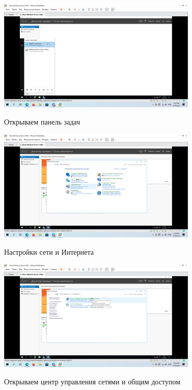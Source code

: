 \documentclass[a4paper]{article}
\begin{document}
  \begin{figure}[H]
    \centering
    \includegraphics[width=0.85\textwidth]{5_0013}
    \label{img:13}
    \caption{Открываем панель задач}
  \end{figure}

  \begin{figure}[H]
    \centering
    \includegraphics[width=0.85\textwidth]{5_0014}
    \label{img:14}
    \caption{Настройки сети и Интернета}
  \end{figure}

  \begin{figure}[H]
    \centering
    \includegraphics[width=0.85\textwidth]{5_0015}
    \label{img:15}
    \caption{Открываем центр управления сетями и общим доступом}
  \end{figure}
\end{document}
